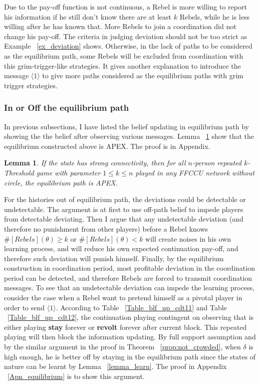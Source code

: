 \documentclass[12pt,letter]{article}
\newtheorem{lemma}{Lemma}[section]
\theoremstyle{definition}
\theoremstyle{remark}
\theoremstyle{claim}
\begin{document}
Due to the pay-off function is not continuous, a Rebel is more willing to report his information if he still don't know there are at least $k$ Rebels, while he is less willing after he has known that. More Rebels to join a coordination did not change his pay-off.  The criteria in judging deviation should not be too strict as Example ~\ref{ex_deviation} shows. Otherwise, in the lack of paths to be considered as the equilibrium path, some Rebels will be excluded from coordination with this grim-trigger-like strategies. It gives another explanation to introduce the message $\langle 1 \rangle$ to give more paths considered as the equilibrium paths with grim trigger strategies. 

\subsubsection{In or Off the equilibrium path}

In previous subsections, I have listed the belief updating in equilibrium path by showing the the belief after observing various messages. Lemma ~\ref{lemma_in_the_path} show that the equilibrium constructed above is APEX. The proof is in Appendix.
\begin{lemma}\label{lemma_in_the_path}
If the state has strong connectivity, then for all $n$-person repeated $k$-Threshold game with parameter $1\leq k\leq n$ played in any FFCCU network without circle, the equilibrium path is APEX.
\end{lemma}

For the histories out of equilibrium path, the deviations could be detectable or undetectable. The argument is at first to use off-path belief to impede players from detectable deviating. Then I argue that any undetectable deviation (and therefore no punishment from other players) before a Rebel knows $\#[Rebels](\theta)\geq k$ or $\#[Rebels](\theta)< k$ will create noises in his own learning process, and will reduce his own expected continuation pay-off, and therefore such deviation will punish himself. Finally, by the equilibrium construction in coordination period, most profitable deviation in the coordination period can be detected, and therefore Rebels are forced to transmit coordination messages. To see that an undetectable deviation can impede the learning process, consider the case when a Rebel want to pretend himself as a pivotal player in order to send $\langle 1 \rangle$. According to Table ~\ref{Table_blf_up_cdt11} and Table ~\ref{Table_blf_up_cdt12}, the continuation playing contingent on observing that is either playing \textbf{stay} forever or \textbf{revolt} forever after current block. This repeated playing will then block the information updating. By full support assumption and by the similar argument in the proof in Theorem ~\ref{prop:not_crowded}, when $\delta$ is high enough, he is better off by staying in the equilibrium path since the states of nature can be learnt by Lemma ~\ref{lemma_learn}. The proof in Appendix ~\ref{Apn_equilibrium} is to show this argument. 
\end{document}

